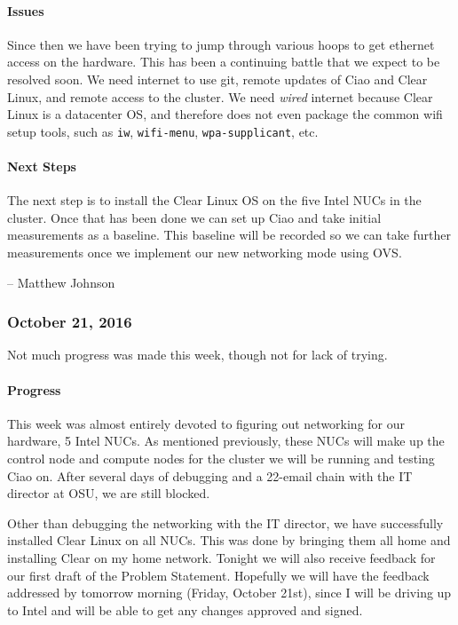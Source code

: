 \documentclass[10pt,onecolumn,journal,draftclsnofoot]{IEEEtran}
\begin{document}
\paragraph{Issues} 

Since then we have been trying to jump through various hoops to get
ethernet access on the hardware. This has been a continuing battle that
we expect to be resolved soon. We need internet to use git, remote
updates of Ciao and Clear Linux, and remote access to the cluster. We
need \emph{wired} internet because Clear Linux is a datacenter OS, and
therefore does not even package the common wifi setup tools, such as
\lstinline!iw!, \lstinline!wifi-menu!, \lstinline!wpa-supplicant!, etc.

\paragraph{Next Steps} 

The next step is to install the Clear Linux OS on the five Intel NUCs in
the cluster. Once that has been done we can set up Ciao and take initial
measurements as a baseline. This baseline will be recorded so we can
take further measurements once we implement our new networking mode
using OVS.

-- Matthew Johnson

\subsubsection{October 21, 2016} 

Not much progress was made this week, though not for lack of trying.

\paragraph{Progress} 

This week was almost entirely devoted to figuring out networking for our
hardware, 5 Intel NUCs. As mentioned previously, these NUCs will make up
the control node and compute nodes for the cluster we will be running
and testing Ciao on. After several days of debugging and a 22-email
chain with the IT director at OSU, we are still blocked.

Other than debugging the networking with the IT director, we have
successfully installed Clear Linux on all NUCs. This was done by
bringing them all home and installing Clear on my home network. Tonight
we will also receive feedback for our first draft of the Problem
Statement. Hopefully we will have the feedback addressed by tomorrow
morning (Friday, October 21st), since I will be driving up to Intel and
will be able to get any changes approved and signed.
\end{document}
